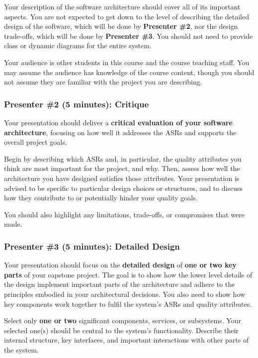 \documentclass{csse4400}
\begin{document}
Your description of the software architecture should cover all of its important aspects.
You are not expected to get down to the level of describing the detailed design of the software, which will be done by \textbf{Presenter \#2}, nor the design trade-offs, which will be done by \textbf{Presenter \#3}.
You should not need to provide class or dynamic diagrams for the entire system.

Your audience is other students in this course and the course teaching staff.
You may assume the audience has knowledge of the course content,
though you should not assume they are familiar with the project you are describing.

\subsubsection{Presenter \#2 (5 minutes): Critique}

Your presentation should deliver a \textbf{critical evaluation of your software architecture},
focusing on how well it addresses the ASRs and supports the overall project goals.

Begin by describing which ASRs and,
in particular, the quality attributes you think are most important for the project, and why.
Then, assess how well the architecture you have designed satisfies those attributes.
Your presentation is advised to be specific to particular design choices or structures,
and to discuss how they contribute to or potentially hinder your quality goals.

You should also highlight any limitations, trade-offs, or compromises that were made.

\subsubsection{Presenter \#3 (5 minutes): Detailed Design}

Your presentation should focus on the \textbf{detailed design} of \textbf{one or two key parts} of your capstone project.
The goal is to show how the lower level details of the design implement important parts of the architecture
and adhere to the principles embodied in your architectural decisions.
You also need to show how key components work together to fulfil the system's ASRs and quality attributes.

Select only \textbf{one or two} significant components, services, or subsystems. Your selected one(s) should be central to the system's functionality. Describe their internal structure, key interfaces,
and important interactions with other parts of the system.
\end{document}
